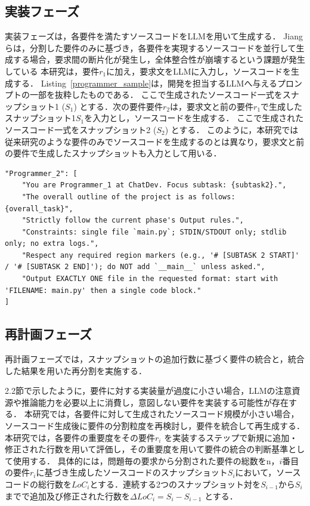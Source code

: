 \documentclass[submit,techrep,noauthor]{ipsj}
\begin{document}
\subsection{実装フェーズ}

実装フェーズは，各要件を満たすソースコードをLLMを用いて生成する．
Jiangらは，分割した要件のみに基づき，各要件を実現するソースコードを並行して生成する場合，要求間の断片化が発生し，全体整合性が崩壊するという課題が発生している\cite{tosem}
本研究は，要件$r_1$に加え，要求文をLLMに入力し，ソースコードを生成する．
Listing~\ref{programmer_sample}は，開発を担当するLLMへ与えるプロンプトの一部を抜粋したものである．
ここで生成されたソースコード一式をスナップショット1 ($S_1$) とする．次の要件要件$r_2$は，要求文と前の要件$r_1$で生成したスナップショット1$S_1$を入力とし，ソースコードを生成する．
ここで生成されたソースコード一式をスナップショット2 ($S_2$) とする．
このように，本研究では従来研究のような要件のみでソースコードを生成するのとは異なり，要求文と前の要件で生成したスナップショットも入力として用いる．

\begin{lstlisting}[caption=実装を行うLLMへ与えるプロンプト例, label=programmer_sample, captionpos=t, columns=fullflexible, breaklines=true]
"Programmer_2": [
    "You are Programmer_1 at ChatDev. Focus subtask: {subtask2}.",
    "The overall outline of the project is as follows: {overall_task}",  
    "Strictly follow the current phase's Output rules.",
    "Constraints: single file `main.py`; STDIN/STDOUT only; stdlib only; no extra logs.",
    "Respect any required region markers (e.g., '# [SUBTASK 2 START]' / '# [SUBTASK 2 END]'); do NOT add `__main__` unless asked.",
    "Output EXACTLY ONE file in the requested format: start with 'FILENAME: main.py' then a single code block."
]
\end{lstlisting}

\subsection{再計画フェーズ}
再計画フェーズでは，スナップショットの追加行数に基づく要件の統合と，統合した結果を用いた再分割を実施する．

2.2節で示したように，要件に対する実装量が過度に小さい場合，LLMの注意資源や推論能力を必要以上に消費し，意図しない要件を実装する可能性が存在する\cite{tosem}．
本研究では，各要件に対して生成されたソースコード規模が小さい場合，ソースコード生成後に要件の分割粒度を再検討し，要件を統合して再生成する．
本研究では，各要件の重要度をその要件$r_i$ を実装するステップで新規に追加・修正された行数を用いて評価し，その重要度を用いて要件の統合の判断基準として使用する．
具体的には，問題毎の要求から分割された要件の総数をn，$i$番目の要件$r_i$に基づき生成したソースコードのスナップショット$S_i$において，ソースコードの総行数を$LoC_i$とする．連続する2つのスナップショット対を$S_{i-1}$から$S_i$までで追加及び修正された行数を$\Delta LoC_i = S_i - S_{i-1}$ とする．
\end{document}
